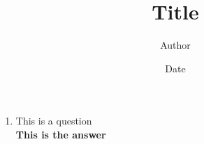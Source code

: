 \documentclass[11pt]{article} %
\title{\textbf{Title}}
\author{Author}
\date{Date}
\providecommand{\question}[1]{\item #1}
\providecommand{\answer}[1]{\\[1.3mm]\textbf{#1}}
\begin{document}
\maketitle

\begin{enumerate}

\question{This is a question}
\answer{This is the answer}

\end{enumerate}






\end{document}
